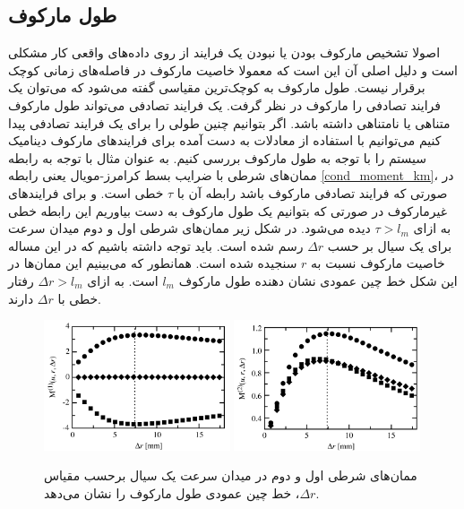 \subsection{طول مارکوف}
اصولا تشخیص مارکوف بودن یا نبودن یک فرایند از روی داده‌های واقعی کار مشکلی است و دلیل اصلی آن این است که معمولا خاصیت مارکوف 
در فاصله‌های زمانی کوچک برقرار نیست. طول مارکوف به کوچک‌ترین مقیاسی گفته 
می‌شود که می‌توان یک فرایند تصادفی را مارکوف در نظر گرفت. یک فرایند تصادفی می‌تواند طول مارکوف متناهی یا نامتناهی داشته باشد.\cite{friedrich_approaching_2011} 
اگر بتوانیم چنین طولی را برای یک فرایند تصادفی پیدا کنیم می‌توانیم با استفاده از معادلات به دست آمده برای فرایندهای مارکوف دینامیک سیستم 
را با توجه به طول مارکوف بررسی کنیم. به عنوان مثال با توجه به رابطه ممان‌های شرطی با ضرایب بسط کرامرز-مویال یعنی رابطه 
\ref{cond_moment_km}، در صورتی که فرایند تصادفی مارکوف باشد رابطه آن با $\tau$ خطی است. و برای فرایندهای غیرمارکوف 
در صورتی که بتوانیم یک طول مارکوف به دست بیاوریم این رابطه خطی به ازای $\tau > l_m$ دیده می‌شود. 
در شکل زیر ممان‌های شرطی اول و دوم میدان سرعت برای یک سیال بر حسب $\Delta r$ رسم شده است. 
باید توجه داشته باشیم که در این مساله خاصیت مارکوف نسبت به $r$ سنجیده شده است. همانطور که می‌بینیم این ممان‌ها 
در این شکل خط چین عمودی نشان دهنده طول مارکوف $l_m$ است.
به ازای $\Delta r > l_m$ رفتار خطی با $\Delta r$ دارند.\cite{siefert2006joint}
\begin{figure}[H]
  \centering
  \subcaptionbox{}
  {\includegraphics[width=0.49\textwidth]{images/fmoment.png}}
  \subcaptionbox{}
  {\includegraphics[width=0.49\textwidth]{images/smoment.png}}
  \caption{ممان‌های شرطی اول و دوم در میدان سرعت یک سیال برحسب مقیاس $\Delta r$، خط چین عمودی طول مارکوف را نشان می‌دهد.\cite{siefert2006joint}}
\end{figure}
\FloatBarrier

